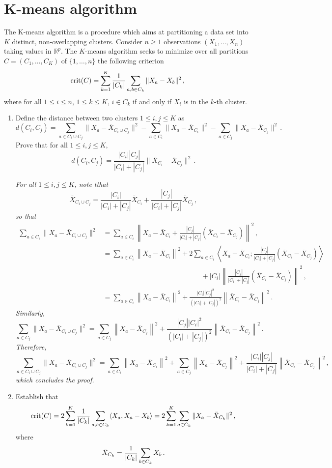 \section{K-means algorithm}
The K-means algorithm is a procedure which aims at partitioning a data set into $K$ distinct, non-overlapping clusters.
Consider $n\geqslant 1$ observations $(X_{1},\ldots,X_{n})$ taking values in $\mathbb{R}^p$.
The $K$-means algorithm seeks to minimize over all partitions $C = (C_{1},\ldots,C_{K})$ of $\{1,\ldots,n\}$ the following criterion
\[
\textrm{crit}(C)=\sum_{k=1}^K{1\over |C_{k}|}\sum_{a,b\in C_{k}} \|X_{a}-X_{b}\|^2\,,
\]
where for all $1\leqslant i\leqslant n$, $1\leqslant k\leqslant K$, $i\in C_k$ if and only if $X_i$ is in the $k$-th cluster.
\begin{enumerate}
\item Define the distance between two clusters $1\leqslant i,j\leqslant K$ as 
\[
d(C_i,C_j) = \sum_{a\in C_i\cup C_j}\|X_{a}-\bar{X}_{C_{i}\cup C_j}\|^2 - \sum_{a\in C_i}\|X_{a}-\bar{X}_{C_i}\|^2 -\sum_{a\in  C_j}\|X_{a}-\bar{X}_{C_j}\|^2\,.
\]
Prove that for all $1\leqslant i,j\leqslant K$,
\[
d(C_i,C_j) = \frac{|C_i||C_j|}{|C_i|+|C_j|}\|\bar{X}_{C_{i}}-\bar{X}_{C_{j}}\|^2\,.
\]

\vspace{.2cm}

{\em
 For all $1\leqslant i,j\leqslant K$, note tthat
\[
\bar{X}_{C_{i}\cup C_j} = \frac{|C_i|}{|C_i|+|C_j|}\bar{X}_{C_{i}} + \frac{|C_j|}{|C_i|+|C_j|}\bar{X}_{C_j}\,,
\]
so that
\begin{align*}
 \sum_{a\in C_i}\|X_{a}-\bar{X}_{C_{i}\cup C_j}\|^2 & =\sum_{a\in C_i}\left\|X_{a}-\bar{X}_{C_{i}} + \frac{|C_j|}{|C_i|+|C_j|}(\bar{X}_{C_{i}} -\bar{X}_{C_{j}} )\right\|^2  \,,\\
&= \sum_{a\in C_i}\left\|X_{a}-\bar{X}_{C_{i}}\right\|^2 + 2\sum_{a\in C_i}\left \langle X_{a}-\bar{X}_{C_{i}};\frac{|C_j|}{|C_i|+|C_j|}(\bar{X}_{C_{i}} -\bar{X}_{C_{j}})\right\rangle  \\
&\hspace{6cm}+ |C_i|\left\|\frac{|C_j|}{|C_i|+|C_j|}(\bar{X}_{C_{i}} -\bar{X}_{C_{j}})\right\|^2\,,\\
&=  \sum_{a\in C_i}\left\|X_{a}-\bar{X}_{C_{i}}\right\|^2 + \frac{|C_i||C_j|^2}{(|C_i|+|C_j|)^2}\left\|\bar{X}_{C_{i}} -\bar{X}_{C_{j}}\right\|^2\,.
\end{align*}
Similarly,
\[
\sum_{a\in C_j}\|X_{a}-\bar{X}_{C_{i}\cup C_j}\|^2 = \sum_{a\in C_j}\left\|X_{a}-\bar{X}_{C_{j}}\right\|^2 + \frac{|C_j||C_i|^2}{(|C_i|+|C_j|)^2}\left\|\bar{X}_{C_{i}} -\bar{X}_{C_{j}}\right\|^2\,.
\]
Therefore,
\[
 \sum_{a\in C_i\cup C_j}\|X_{a}-\bar{X}_{C_{i}\cup C_j}\|^2 =  \sum_{a\in C_i}\left\|X_{a}-\bar{X}_{C_{i}}\right\|^2 +  \sum_{a\in C_j}\left\|X_{a}-\bar{X}_{C_{j}}\right\|^2 + \frac{|C_i||C_j|}{|C_i|+|C_j|}\left\|\bar{X}_{C_{i}} -\bar{X}_{C_{j}}\right\|^2\,,
\]
which concludes the proof.
}
\item  Establish that
\[
\textrm{crit}(C)= 2\sum_{k=1}^K{1\over |C_{k}|}\sum_{a,b\in C_{k}} \langle X_{a},X_{a}-X_{b}\rangle = 2\sum_{k=1}^K\sum_{a\in C_{k}}\|X_{a}-\bar{X}_{C_{k}}\|^2\,,
\]
where
\[
\bar{X}_{C_{k}}={1\over |C_{k}|}\sum_{b\in C_{k}} X_{b}\,.
\]


\end{enumerate}
